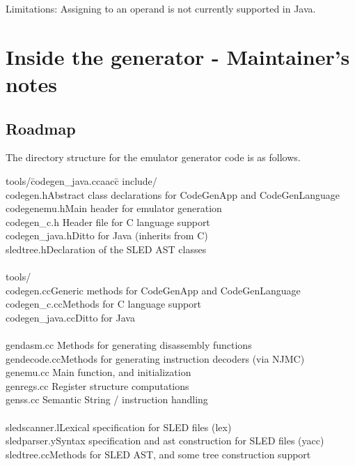 Limitations: Assigning to an operand is not currently supported in Java.


\section{Inside the generator - Maintainer's notes}

\subsection{Roadmap}
The directory structure for the emulator generator code is as 
follows.  

\begin{tabbing}
tools/\=codegen\_java.ccaacc\=\kill
include/\\
  \>codegen.h\>Abstract class declarations for CodeGenApp and CodeGenLanguage\\
  \>codegenemu.h\>Main header for emulator generation\\
  \>codegen\_c.h\> Header file for C language support\\
  \>codegen\_java.h\>Ditto for Java (inherits from C)\\
  \>sledtree.h\>Declaration of the SLED AST classes\\
\\
tools/\\
  \>codegen.cc\>Generic methods for CodeGenApp and CodeGenLanguage\\
  \>codegen\_c.cc\>Methods for C language support\\
  \>codegen\_java.cc\>Ditto for Java\\
\\
  \>gendasm.cc\>  Methods for generating disassembly functions\\
  \>gendecode.cc\>Methods for generating instruction decoders (via NJMC)\\
  \>genemu.cc\>   Main function, and initialization\\
  \>genregs.cc\>  Register structure computations\\
  \>genss.cc\>    Semantic String / instruction handling\\
\\
  \>sledscanner.l\>Lexical specification for SLED files (lex)\\
  \>sledparser.y\>Syntax specification and ast construction for SLED files  (yacc)\\
  \>sledtree.cc\>Methods for SLED AST, and some tree construction support\\

\end{tabbing}
